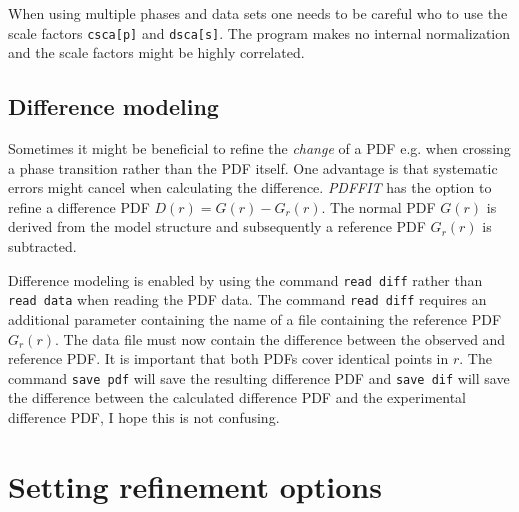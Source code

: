 When using multiple phases and data sets one needs to be careful
who to use the scale factors {\tt csca[p]} and {\tt dsca[s]}. The
program makes no internal normalization and the scale factors might
be highly correlated.

\subsection{Difference modeling \label{fit_diff}}

Sometimes it might be beneficial to refine the {\it change} of
a PDF e.g. when crossing a phase transition rather than the PDF
itself. One advantage is that systematic errors might cancel when
calculating the difference. {\it PDFFIT} has the option to refine
a difference PDF $D(r) = G(r) - G_{r}(r)$. The normal PDF $G(r)$
is derived from the model structure and subsequently a reference
PDF $G_{r}(r)$ is subtracted. \par

Difference modeling is enabled by using the command {\tt read
diff} rather than {\tt read data} when reading the PDF data. The
command {\tt read diff} requires an additional parameter containing
the name of a file containing the reference PDF $G_{r}(r)$. The data
file must now contain the difference between the observed and
reference PDF. It is important that both PDFs cover identical points
in $r$. The command {\tt save pdf} will save the resulting difference
PDF and {\tt save dif} will save the difference between the calculated
difference PDF and the experimental difference PDF, I hope this is
not confusing.

\section{Setting refinement options \label{fit_opt}}


